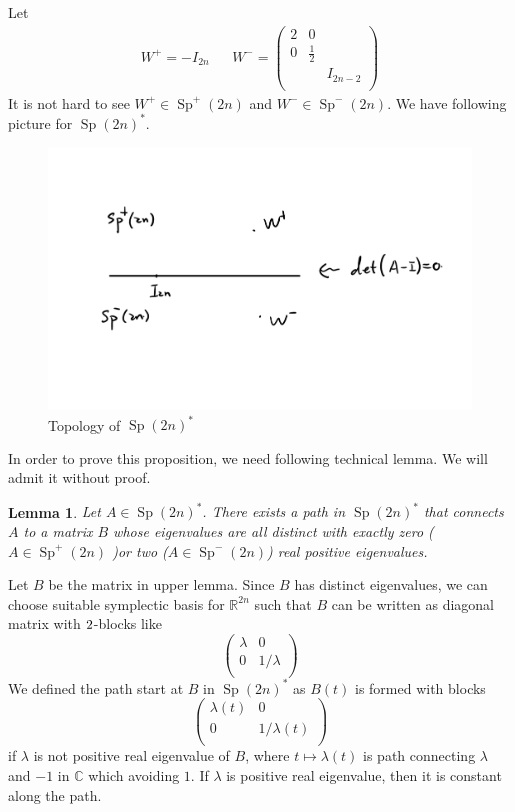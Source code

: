 \documentclass[a4paper,11pt]{amsart}
\DeclareMathOperator{\Sp}{Sp}
\theoremstyle{plain}
\newtheorem{lemma}{Lemma}[subsection]
\theoremstyle{theorem}
\theoremstyle{definition}
\begin{document}
Let 
\[
\begin{aligned}
 W^+ = -I_{2n}& & W^- = \begin{pmatrix}
 2&0 & \\
 0 &\frac{1}{2}& \\
  & &I_{2n-2}\\
 \end{pmatrix}
\end{aligned}
\]
It is not hard to see $W^+ \in \Sp^+(2n)$ and $W^- \in \Sp^-(2n)$. We have following picture for $\Sp(2n)^*$.
\begin{figure}[h]
	\caption{Topology of $\Sp(2n)^*$}
\centering\includegraphics[scale=0.5]{PIC/maslov1.png}
\end{figure}
In order to prove this proposition, we need following technical lemma. We will admit it without proof.
\begin{lemma}
	Let $A \in \Sp(2n)^*$. There exists a path in $\Sp(2n)^*$ that connects $A$ to a matrix $B$ whose eigenvalues are all distinct with exactly zero  ($ A \in \Sp^+(2n)$ )or two ($A \in \Sp^-(2n)$) real positive eigenvalues.
\end{lemma}
Let $B$ be the matrix in upper lemma. Since $B$ has distinct eigenvalues, we can choose suitable symplectic basis for $\mathbb{R}^{2n}$ such that $B$ can be written as diagonal matrix with $2\time2$-blocks like
\[
\begin{pmatrix}
 \lambda & 0 \\
 0 & 1/\lambda\\
\end{pmatrix}
\]
We defined the path start at $B$ in $\Sp(2n)^*$ as $B(t)$ is formed with blocks
\[
\begin{pmatrix}
 \lambda(t) & 0 \\
 0 & 1/\lambda(t)\\
\end{pmatrix}
\]
if $\lambda$ is not positive real eigenvalue of $B$, where $t \mapsto \lambda(t)$ is path connecting $\lambda
$ and $-1$ in $\mathbb{C}$ which avoiding $1$.
If $\lambda$ is positive real eigenvalue, then it is constant along the path.
 
\end{document}
